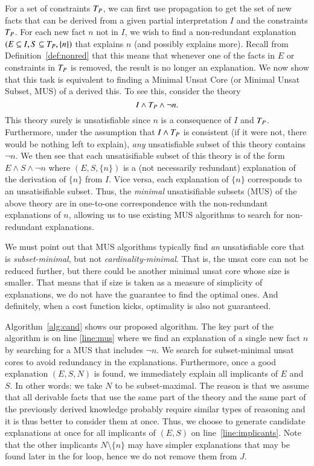 For a set of constraints $T_P$, we can first use propagation to get the set of new facts that can be derived from a given partial interpretation $I$ and the constraints $T_P$. 
For each new fact $n$ not in $I$, we wish to find a non-redundant explanation $(E \subseteq I, S \subseteq T_P,\{n\})$ that explains $n$ (and possibly explains more). 
Recall from Definition~\ref{def:nonred} that this means that whenever one of the facts in $E$ or constraints in $T_P$ is removed, the result is no longer an explanation.
We now show that this task is equivalent to finding a Minimal Unsat Core (or Minimal Unsat Subset, MUS) of a derived this.
To see this, consider the theory
\[ I\wedge T_P \wedge \lnot n.\]
This theory surely is unsatisfiable since $n$ is a consequence of $I$ and $T_P$.
Furthermore, under the assumption that $I\wedge T_P$ is consistent (if it were not, there would be nothing left to explain),
\emph{any} unsatisfiable subset of this theory contains $\lnot n$.
We then see that each unsatisifiable subset of this theory is of the form $E \wedge S \wedge \lnot n$ where $(E,S,\{n\})$ is a (not necessarily redundant) explanation of the derivation of $\{n\}$ from $I$.
Vice versa, each explanation of $\{n\}$ corresponds to an unsatisifiable subset. Thus, the \emph{minimal} unsatisifiable subsets (MUS) of the above theory are in one-to-one correspondence with the non-redundant explanations of $n$, allowing us to use existing MUS algorithms to search for non-redundant explanations.

We must point out that MUS algorithms typically find \textit{an} unsatisfiable core that is \textit{subset-minimal}, but not \textit{cardinality-minimal}. That is, the unsat core can not be reduced further, but there could be another minimal unsat core whose size is smaller.
That means that if size is taken as a measure of simplicity of explanations, we do not have the guarantee to find the optimal ones. And definitely, when a cost function kicks, optimality is also not guaranteed.

Algorithm~\ref{alg:cand} shows our proposed algorithm. The key part of the algorithm is on line \ref{line:mus} where we find an explanation of a single new fact $n$ by searching for a MUS that includes $\neg n$.
We search for subset-minimal unsat cores to avoid redundancy in the explanations.
Furthermore, once a good explanation $(E,S,N)$ is found, we immediately explain all implicants of $E$ and $S$. In other words: we take $N$ to be subset-maximal.
The reason is that we assume that all derivable facts that use the same part of the theory and the same part of the previously derived knowledge probably require similar types of reasoning and it is thus better to consider them at once.
Thus, we choose to generate candidate explanations at once for all implicants of $(E, S)$ on line~\ref{line:implicants}.
Note that the other implicants $N \setminus \{n\}$ may have simpler explanations that may be found later in the for loop, hence we do not remove them from $J$.

